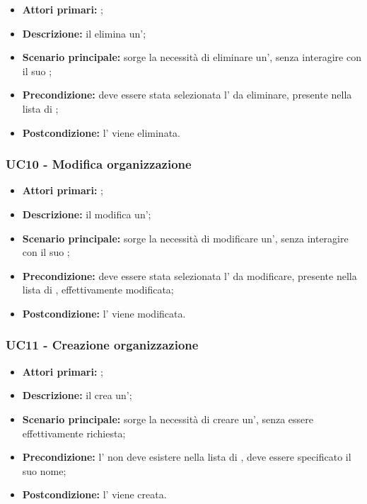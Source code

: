 \documentclass[../analisi-dei-requisiti]{subfiles}
\begin{document}
\begin{itemize}
\item \textbf{Attori primari:} ;
\item \textbf{Descrizione:} il  elimina un';
\item \textbf{Scenario principale:} sorge la necessità di eliminare un', senza interagire con il suo ; 
\item \textbf{Precondizione:} deve essere stata selezionata l' da eliminare, presente nella lista di ;
\item \textbf{Postcondizione:} l' viene eliminata.

\end{itemize}


\subsubsection{UC10 - Modifica organizzazione}
\label{subsub:UC10}

\begin{itemize}
\item \textbf{Attori primari:} ;
\item \textbf{Descrizione:} il  modifica un';
\item \textbf{Scenario principale:} sorge la necessità di modificare un', senza interagire con il suo ; 
\item \textbf{Precondizione:} deve essere stata selezionata l' da modificare, presente nella lista di , effettivamente modificata;
\item \textbf{Postcondizione:} l' viene modificata.

\end{itemize}


\subsubsection{UC11 - Creazione organizzazione}
\label{subsub:UC11}

\begin{itemize}
\item \textbf{Attori primari:} ;
\item \textbf{Descrizione:} il  crea un';
\item \textbf{Scenario principale:} sorge la necessità di creare un', senza essere effettivamente richiesta; 
\item \textbf{Precondizione:} l' non deve esistere nella lista di , deve essere specificato il suo nome;
\item \textbf{Postcondizione:} l' viene creata.

\end{itemize}
\end{document}
